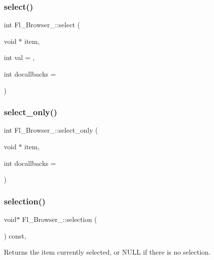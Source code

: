 \subsubsection{\texorpdfstring{select()}{select()}}
{\footnotesize\ttfamily int Fl\+\_\+\+Browser\+\_\+\+::select (\begin{DoxyParamCaption}\item[{void $\ast$}]{item,  }\item[{int}]{val = {},  }\item[{int}]{docallbacks = {} }\end{DoxyParamCaption})}

\mbox{\label{class_fl___browser___a7012b37539c19c46cef95dc7cb556199}} 
\subsubsection{\texorpdfstring{select\+\_\+only()}{select\_only()}}
{\footnotesize\ttfamily int Fl\+\_\+\+Browser\+\_\+\+::select\+\_\+only (\begin{DoxyParamCaption}\item[{void $\ast$}]{item,  }\item[{int}]{docallbacks = {} }\end{DoxyParamCaption})}

\mbox{\label{class_fl___browser___a0def0e61d7de24c2ebaa3dfa982232c1}} 
\subsubsection{\texorpdfstring{selection()}{selection()}}
{\footnotesize\ttfamily void$\ast$ Fl\+\_\+\+Browser\+\_\+\+::selection (\begin{DoxyParamCaption}{ }\end{DoxyParamCaption}) const\hspace{0.3cm}{\ttfamily [inline]}, {\ttfamily [protected]}}

Returns the item currently selected, or N\+U\+LL if there is no selection.

